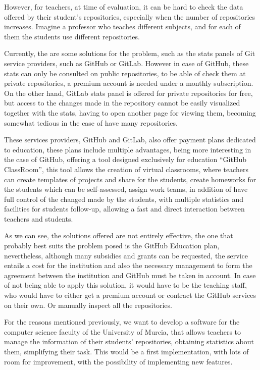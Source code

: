 However, for teachers, at time of evaluation, it can be hard to check the
data offered by their student’s repositories, especially when the number of
repositories increases. Imagine a professor who teaches different subjects,
and for each of them the students use different repositories.

Currently, the are some solutions for the problem, such as the stats
panels of Git service providers, such as GitHub\cite{GitHub} or
GitLab\cite{GitLab}. However in case of GitHub, these stats can only
be consulted on public repositories, to be able of check them at
private repositories, a premium account is needed under a monthly
subscription. On the other hand, GitLab stats panel is offered for
private repositories for free, but access to the changes made in the
repository cannot be easily visualized together with the stats, having
to open another page for viewing them, becoming somewhat tedious in
the case of have many repositories.

These services providers, GitHub and GitLab, also offer payment plans
dedicated to education, these plans include multiple advantages, being more
interesting in the case of GitHub, offering a tool designed exclusively for
education ``GitHub ClassRoom'', this tool allows the creation of virtual
classrooms, where teachers can create templates of projects and share for
the students, create homeworks for the students which can be self-assessed,
assign work teams, in addition of have full control of the changed made by
the students, with multiple statistics and facilities for students
follow-up, allowing a fast and direct interaction between teachers and
students.

As we can see, the solutions offered are not entirely effective, the one
that probably best suits the problem posed is the GitHub Education plan,
nevertheless, although many subsidies and grants can be requested, the
service entails a cost for the institution and also the necessary
management to form the agreement between the institution and GitHub must be
taken in account. In case of not being able to apply this solution, it
would have to be the teaching staff, who would have to either get a premium
account or contract the GitHub services on their own. Or manually inspect
all the repositories.

For the reasons mentioned previously, we want to develop a software for the
computer science faculty of the University of Murcia, that allows teachers
to manage the information of their students' repositories, obtaining
statistics about them, simplifying their task. This would be a first
implementation, with lots of room for improvement, with the possibility of
implementing new features.

